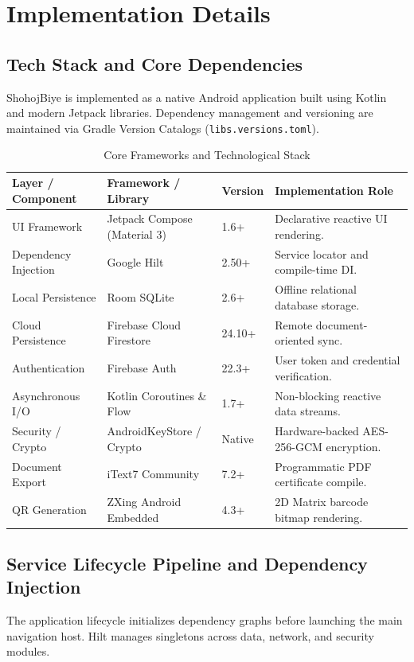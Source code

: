 \documentclass[12pt,a4paper]{article}
\begin{document}
	
	\section{Implementation Details}
	
	\subsection{Tech Stack and Core Dependencies}
	ShohojBiye is implemented as a native Android application built using Kotlin and modern Jetpack libraries. Dependency management and versioning are maintained via Gradle Version Catalogs (\texttt{libs.versions.toml}).
	
	\begin{table}[h!]
		\centering
		\small
		\caption{Core Frameworks and Technological Stack}
		\label{tab:tech_stack}
		\begin{tabularx}{\textwidth}{@{}l l l L@{}}
			\toprule
			\textbf{Layer / Component} & \textbf{Framework / Library} & \textbf{Version} & \textbf{Implementation Role} \\ \midrule
			UI Framework & Jetpack Compose (Material 3) & 1.6+ & Declarative reactive UI rendering. \\
			Dependency Injection & Google Hilt & 2.50+ & Service locator and compile-time DI. \\
			Local Persistence & Room SQLite & 2.6+ & Offline relational database storage. \\
			Cloud Persistence & Firebase Cloud Firestore & 24.10+ & Remote document-oriented sync. \\
			Authentication & Firebase Auth & 22.3+ & User token and credential verification. \\
			Asynchronous I/O & Kotlin Coroutines \& Flow & 1.7+ & Non-blocking reactive data streams. \\
			Security / Crypto & AndroidKeyStore / Crypto & Native & Hardware-backed AES-256-GCM encryption. \\
			Document Export & iText7 Community & 7.2+ & Programmatic PDF certificate compile. \\
			QR Generation & ZXing Android Embedded & 4.3+ & 2D Matrix barcode bitmap rendering. \\ \bottomrule
		\end{tabularx}
	\end{table}
	
	\subsection{Service Lifecycle Pipeline and Dependency Injection}
	The application lifecycle initializes dependency graphs before launching the main navigation host. Hilt manages singletons across data, network, and security modules.
	
\end{document}

